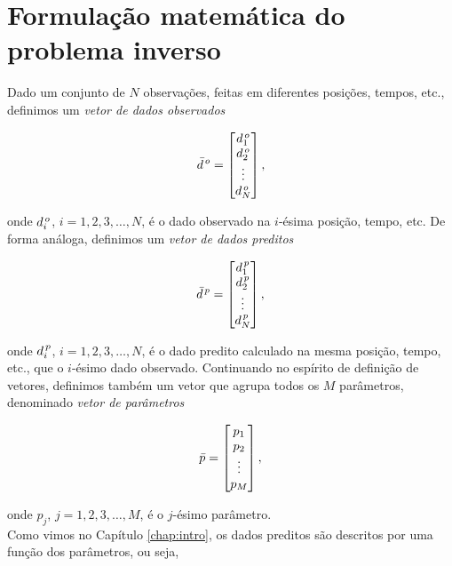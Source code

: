 \chapter{Formulação matemática do problema inverso}

Dado um conjunto de $N$ observações, feitas em diferentes posições, tempos, etc.,
de\-fi\-ni\-mos um {\it vetor de dados observados}

\begin{equation}
\bar{d}^{\thinspace o} =
    \begin{bmatrix}
    d_1^{\thinspace o} \\
    d_2^{\thinspace o} \\
    \vdots \\
    d_N^{\thinspace o}
    \end{bmatrix},
\end{equation}

\noindent onde $d_i^{\thinspace o}$, $i = 1, 2, 3, \dotsc, N$, é o dado
observado na $i$-ésima posição, tempo, etc.
De forma análoga, definimos um {\it vetor de dados preditos}

\begin{equation}
\bar{d}^{\thinspace p} =
    \begin{bmatrix}
    d_1^{\thinspace p} \\
    d_2^{\thinspace p} \\
    \vdots \\
    d_N^{\thinspace p}
    \end{bmatrix},
\end{equation}

\noindent onde $d_i^{\thinspace p}$, $i = 1, 2, 3, \dotsc, N$, é o dado predito
calculado na mesma posição, tempo, etc., que o $i$-ésimo dado observado.
Continuando no espírito de definição de vetores, definimos também um vetor que
agrupa todos os $M$ parâmetros, denominado {\it vetor de parâmetros}

\begin{equation}
\bar{p} =
    \begin{bmatrix}
    p_1 \\
    p_2 \\
    \vdots \\
    p_M
    \end{bmatrix},
\end{equation}

\noindent onde $p_j$, $j = 1, 2, 3, \dotsc, M$, é o $j$-ésimo parâmetro.
\\
\indent Como vimos no Capítulo \ref{chap:intro}, os dados preditos são descritos
por uma função dos parâmetros, ou seja,

